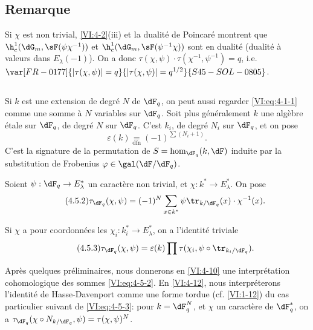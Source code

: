 \subsection{Remarque}\label{VI:4-4}

Si $\chi$ est non trivial, \ref{VI:4-2}(iii) et la dualité de Poincaré 
montrent que $\h_c^1(\dG_m,\sF(\psi\chi^{-1}))$ et 
$\h_c^1(\dG_m,\sF(\psi^{-1}\chi))$ sont en dualité (dualité à valeurs 
dans $E_\lambda(-1)$). On a donc 
$\tau(\chi,\psi)\cdot \tau(\chi^{-1},\psi^{-1}) = q$, i.e. 
$\var[FR-0177]{|\tau(\chi,\psi)|=q}{|\tau(\chi,\psi)|=q^{1/2}}{S45-SOL-0805}$. 





\subsection{}\label{VI:4-5}

Si $k$ est une extension de degré $N$ de $\dF_q$, on peut aussi regarder 
\eqref{VI:eq:4-1-1} comme une somme à $N$ variables sur $\dF_q$. Soit plus 
généralement $k$ une algèbre étale sur $\dF_q$, de degré $N$ sur 
$\dF_q$. C'est  $k_i$, de degré $N_i$ sur $\dF_q$, et on pose 
\begin{equation*}\tag{4.5.1}\label{VI:eq:4-5-1}
  \varepsilon(k) \underset{\mathrm{dfn}}{=} (-1)^{\sum (N_i+1)} \text{.} 
\end{equation*}
C'est la signature de la permutation de $S=\hom_{\dF_q}(k,\dF)$ induite par la 
substitution de Frobenius $\varphi\in \gal(\dF/\dF_q)$. 

Soient $\psi:\dF_q\to E_\lambda^\ast$ un caractère non trivial, et 
$\chi:k^\ast \to E_\lambda^\ast$. On pose 
\begin{equation*}\tag{4.5.2}\label{VI:eq:4-5-2}
  \tau_{\dF_q}(\chi,\psi) = (-1)^N \sum_{x\in k^\ast} \psi \tr_{k/\dF_q}(x) \cdot \chi^{-1}(x) \text{.} 
\end{equation*}

Si $\chi$ a pour coordonnées les $\chi_i:k_i^\ast \to E_\lambda^\ast$, on 
a l'identité triviale 
\begin{equation*}\tag{4.5.3}\label{VI:eq:4-5-3}
  \tau_{\dF_q}(\chi,\psi) = \varepsilon(k) \prod \tau(\chi_i,\psi\circ \tr_{k_i/\dF_q}) \text{.}
\end{equation*}

Après quelques préliminaires, nous donnerons en \ref{VI:4-10} une 
interprétation cohomologique des sommes \eqref{VI:eq:4-5-2}. En 
\ref{VI:4-12}, nous interpréterons l'identité de Hasse-Davenport comme une 
forme tordue (cf. \ref{VI:1-12}) du cas particulier suivant de 
\eqref{VI:eq:4-5-3}: pour $k=\dF_q^N$, et $\chi$ un caractère de 
$\dF_q^\ast$, on a 
$\tau_{\dF_q}(\chi\circ N_{k/\dF_q},\psi)=\tau(\chi,\psi)^N$. 





